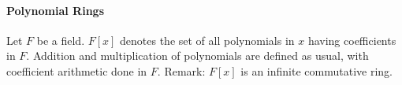 \documentclass[10pt,letter]{article}
\theoremstyle{plain}
\theoremstyle{definition}
\begin{document}
\paragraph{Polynomial Rings}
Let $F$ be a field. $F[x]$ denotes the set of all polynomials in $x$ having coefficients in $F$. Addition and multiplication of polynomials are defined as usual, with coefficient arithmetic done in $F$. Remark: $F[x]$ is an infinite commutative ring.
\end{document}
